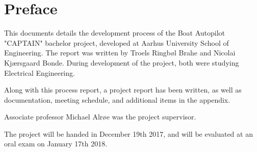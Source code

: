 \chapter{Preface}
This documents details the development process of the Boat Autopilot "CAPTAIN" bachelor project, developed at Aarhus University School of Engineering. The report was written by Troels Ringbøl Brahe and Nicolai Kjærsgaard Bonde. During development of the project, both were studying Electrical Engineering.

Along with this process report, a project report has been written, as well as documentation, meeting schedule, and additional items in the appendix.

Associate professor Michael Alrøe was the project supervisor.

The project will be handed in December 19th 2017, and will be evaluated at an oral exam on January 17th 2018.